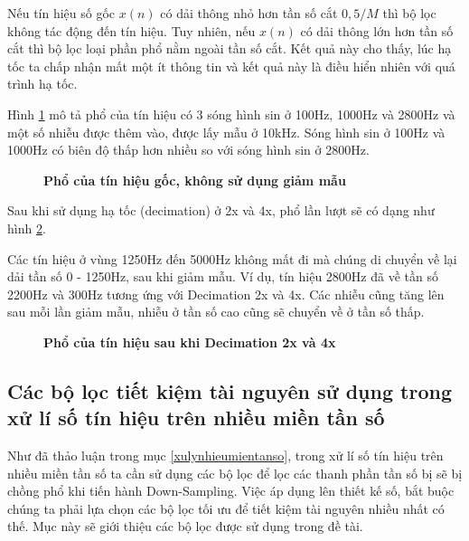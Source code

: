 Nếu tín hiệu số gốc $x(n)$ có dải thông nhỏ hơn tần số cắt $0,5/M$ thì bộ lọc không tác động đến tín hiệu. Tuy nhiên, nếu $x(n)$ có dải thông lớn hơn tần số cắt thì bộ lọc loại phần phổ nằm ngoài tần số cắt. Kết quả này cho thấy,
lúc hạ tốc ta chấp nhận mất một ít thông tin và kết quả này là điều hiển nhiên với quá trình hạ tốc.

 Hình \ref{decimation_without_filtering-no_decimation} mô tả phổ của tín hiệu có 3 sóng hình sin ở 100Hz, 1000Hz và 2800Hz và một số nhiễu được thêm vào, được lấy mẫu ở 10kHz. Sóng hình sin ở 100Hz và 1000Hz có biên độ thấp hơn nhiều so với sóng hình sin ở 2800Hz. 

\begin{figure}[H]
    \centering
    
    \caption[Phổ của tín hiệu gốc, không sử dụng giảm mẫu]{\bfseries \fontsize{12pt}{0pt}\selectfont Phổ của tín hiệu gốc, không sử dụng giảm mẫu}
    \label{decimation_without_filtering-no_decimation}
\end{figure}
Sau khi sử dụng hạ tốc (decimation) ở 2x và 4x, phổ lần lượt sẽ có dạng như hình \ref{decimation_without_filtering-2x_4x_decimation}.

Các tín hiệu ở vùng 1250Hz đến 5000Hz không mất đi mà chúng di chuyển về lại dải tần số 0 - 1250Hz, sau khi giảm mẫu. Ví dụ, tín hiệu 2800Hz đã về tần số 2200Hz và 300Hz tương ứng với Decimation 2x và 4x. Các nhiễu cũng tăng lên sau mỗi lần giảm mẫu, nhiễu ở tần số cao cũng sẽ chuyển về ở tần số thấp.
\begin{figure}[H]
    \centering
    
    \caption[Phổ của tín hiệu sau khi Decimation 2x và 4x]{\bfseries \fontsize{12pt}{0pt}\selectfont Phổ của tín hiệu sau khi Decimation 2x và 4x}
    \label{decimation_without_filtering-2x_4x_decimation}
\end{figure}
 
\subsection{Các bộ lọc tiết kiệm tài nguyên sử dụng trong xử lí số tín hiệu trên nhiều miền tần số}
Như đã thảo luận trong mục \ref{xulynhieumientanso}, trong xử lí số tín hiệu trên nhiều miền tần số ta cần sử dụng các bộ lọc để lọc các thanh phần tần số bị sẽ bị chồng phổ khi tiến hành Down-Sampling. Việc áp dụng lên thiết kế số, bắt buộc chúng ta phải lựa chọn các bộ lọc tối ưu để tiết kiệm tài nguyên nhiều nhất có thế. Mục này sẽ giới thiệu các bộ lọc được sử dụng trong đề tài.
